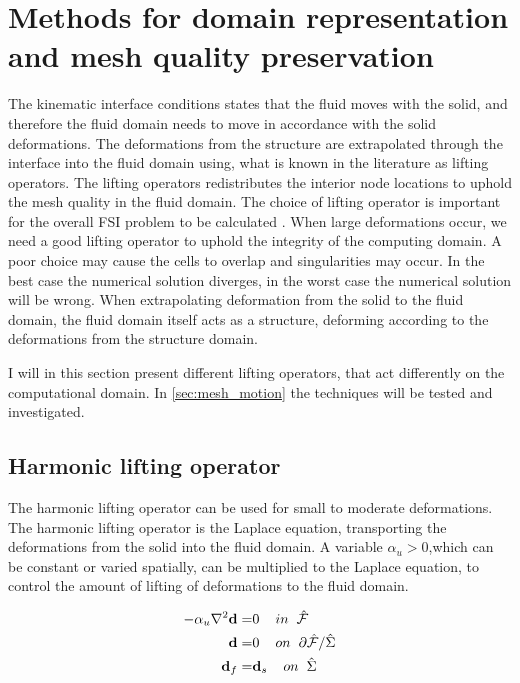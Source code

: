\section{Methods for domain representation and mesh quality preservation} \label{sec:meshmotion}
The kinematic interface conditions states that the fluid moves with the solid, and therefore the fluid domain needs to move in accordance with the solid deformations. The deformations from the structure are extrapolated through the interface into the fluid domain using, what is known in the literature as lifting operators. The lifting operators redistributes the interior node locations to uphold the mesh quality in the fluid domain.
The choice of lifting operator is important for the overall FSI problem to be calculated \cite{Wick2011a}. When large deformations occur, we need a good lifting operator to uphold the integrity of the computing domain. A poor choice may cause the cells to overlap and singularities may occur. In the best case the numerical solution diverges, in the worst case the numerical solution will be wrong.
When extrapolating deformation from the solid to the fluid domain, the fluid domain itself acts as a structure, deforming according to the deformations from the structure domain.\newline

I will in this section present different lifting operators, that act differently on the computational domain. In \ref{sec:mesh_motion} the techniques will be tested and investigated.

\subsection{Harmonic lifting operator}
The harmonic lifting operator can be used for small to moderate deformations. The harmonic lifting operator is the Laplace equation, transporting the deformations from the solid into the fluid domain. A variable $\alpha_u > 0$,which can be constant or varied spatially, can be multiplied to the Laplace equation, to control the amount of lifting of deformations to the fluid domain.

\begin{align}
 - \alpha_u \nabla^2 \bold{d} =& 0\hspace{4mm} in \hspace{2mm} \hat{\mathcal{F}}\\
  \hspace{4mm} \bold{d} =& 0 \hspace{4mm } on \hspace{2mm }  \partial \hat{\mathcal{F}} / \hat{\Sigma} \\
  \bold{d}_f =& \bold{d}_s \hspace{4mm } on \hspace{2mm } \hat{\Sigma} 
\end{align}


